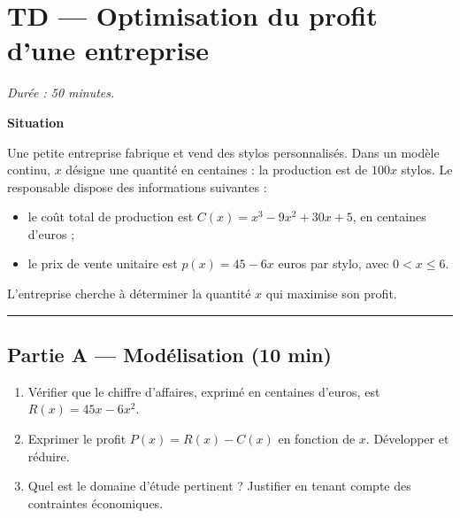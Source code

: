 

\section*{TD — Optimisation du profit d'une entreprise}

\textit{Durée : 50 minutes.}

\bigskip

\begin{center}
\textbf{Situation}

\medskip
\parbox{0.9\textwidth}{Une petite entreprise fabrique et vend des stylos personnalisés.
Dans un modèle continu, $x$ désigne une quantité en centaines : la production
est de $100x$ stylos. Le responsable dispose des informations suivantes :
\begin{itemize}
  \item le coût total de production est $C(x) = x^3 - 9x^2 + 30x + 5$, en centaines d'euros ;
  \item le prix de vente unitaire est $p(x) = 45 - 6x$ euros par stylo, avec $0 < x \leqslant 6$.
\end{itemize}
L'entreprise cherche à déterminer la quantité $x$ qui maximise son profit.}
\end{center}

\bigskip

\hrule

\bigskip

\subsection*{Partie A — Modélisation (10 min)}

\begin{enumerate}
  \item Vérifier que le chiffre d'affaires, exprimé en centaines d'euros, est $R(x) = 45x - 6x^2$.
  \item Exprimer le profit $P(x) = R(x) - C(x)$ en fonction de $x$. Développer et réduire.
  \item Quel est le domaine d'étude pertinent ? Justifier en tenant compte des contraintes économiques.
\end{enumerate}

